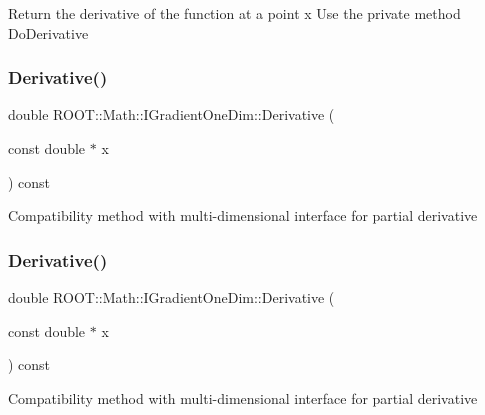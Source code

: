 Return the derivative of the function at a point x Use the private method Do\+Derivative \mbox{\label{classROOT_1_1Math_1_1IGradientOneDim_ab28c444cba126cc1b380d21120dd437f}} 
\subsubsection{\texorpdfstring{Derivative()}{Derivative()}\hspace{0.1cm}{\footnotesize\ttfamily [3/4]}}
{\footnotesize\ttfamily double R\+O\+O\+T\+::\+Math\+::\+I\+Gradient\+One\+Dim\+::\+Derivative (\begin{DoxyParamCaption}\item[{const double $\ast$}]{x }\end{DoxyParamCaption}) const\hspace{0.3cm}{\ttfamily [inline]}}

Compatibility method with multi-\/dimensional interface for partial derivative \mbox{\label{classROOT_1_1Math_1_1IGradientOneDim_ab28c444cba126cc1b380d21120dd437f}} 
\subsubsection{\texorpdfstring{Derivative()}{Derivative()}\hspace{0.1cm}{\footnotesize\ttfamily [4/4]}}
{\footnotesize\ttfamily double R\+O\+O\+T\+::\+Math\+::\+I\+Gradient\+One\+Dim\+::\+Derivative (\begin{DoxyParamCaption}\item[{const double $\ast$}]{x }\end{DoxyParamCaption}) const\hspace{0.3cm}{\ttfamily [inline]}}

Compatibility method with multi-\/dimensional interface for partial derivative \mbox{\label{classROOT_1_1Math_1_1IGradientOneDim_aef5560ea7d43e64d94bf875713e2a5fc}} 
